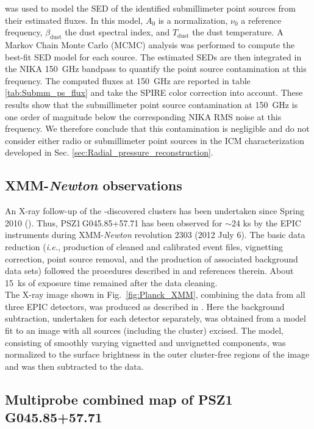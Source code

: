 \documentclass[traditabstract]{aa}
\begin{document}
was used to model the SED of the identified submillimeter point sources from their estimated fluxes. In this model, $A_0$ is a normalization, $\nu_0$ a reference frequency, $\beta_{\mathrm{dust}}$ the dust spectral index, and $T_{\mathrm{dust}}$ the dust temperature. A Markov Chain Monte Carlo (MCMC) analysis was performed to compute the best-fit SED model for each source. The estimated SEDs are then integrated in the NIKA 150~GHz bandpass to quantify the point source contamination at this frequency. The computed fluxes at 150~GHz are reported in table \ref{tab:Submm_ps_flux} and take the SPIRE color correction into account. These results show that the submillimeter point source contamination at 150~GHz is one order of magnitude below the corresponding NIKA RMS noise at this frequency. We therefore conclude that this contamination is negligible and do not consider either radio or submillimeter point sources in the ICM characterization developed in Sec. \ref{sec:Radial_pressure_reconstruction}.

\subsection{XMM-{\it Newton} observations}\label{sec:XMM}
An X-ray follow-up of the \planck-discovered clusters has been undertaken since Spring 2010 (\citealt{XMM_followup}). Thus, \mbox{PSZ1\,G045.85+57.71} has been observed for $\sim 24$ ks by the EPIC instruments during XMM-{\it Newton} revolution 2303 (2012 July 6). The basic data reduction (\emph{i.e.}, production of cleaned and calibrated event files, vignetting correction, point source removal, and the production of associated background data sets) followed the procedures described in \citealt{MACSJ1424NIKA} and references therein. About 15~ks of exposure time remained after the data cleaning.\\
\indent The X-ray image shown in Fig.~\ref{fig:Planck_XMM}, combining the data from all three EPIC detectors, was produced as described in \citealt{boe10}. Here the background subtraction, undertaken for each detector separately, was obtained from a model fit to an image with all sources (including the cluster) excised. The model, consisting of smoothly varying vignetted and unvignetted components, was normalized to the surface brightness in the outer cluster-free regions of the image and was then subtracted to the data.

\subsection{Multiprobe combined map of \mbox{PSZ1\,G045.85+57.71}}\label{sec:map_combi}
\end{document}
